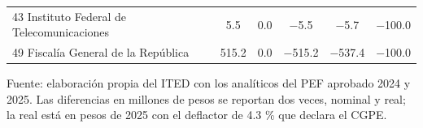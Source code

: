 \begin{table}[htbp]
\begin{tabular}{L{4.2cm}SSSSS}
{43 Instituto Federal de Telecomunicaciones} & \num{5.5} & \num{0.0} & \num{-5.5} & \num{-5.7} & \num{-100.0} \\
{49 Fiscalía General de la República} & \num{515.2} & \num{0.0} & \num{-515.2} & \num{-537.4} & \num{-100.0} \\
\bottomrule
\end{tabular}
\par\vspace{2pt}\footnotesize Fuente: elaboración propia del ITED con los analíticos del PEF aprobado 2024 y 2025. Las diferencias en millones de pesos se reportan dos veces, nominal y real; la real está en pesos de 2025 con el deflactor de 4.3 \% que declara el CGPE.
\end{table}
